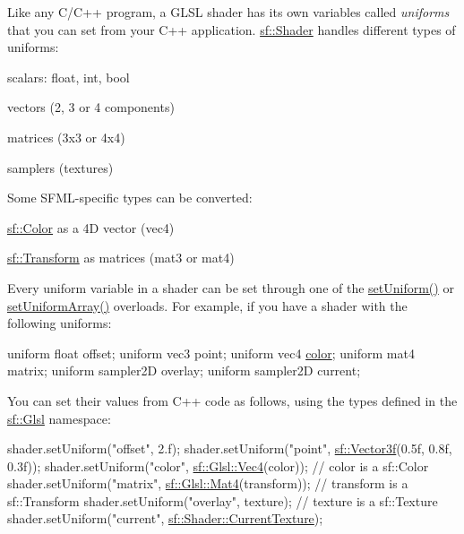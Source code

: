 Like any C/\-C++ program, a G\-L\-S\-L shader has its own variables called {\itshape uniforms} that you can set from your C++ application. \hyperlink{classsf_1_1_shader}{sf\-::\-Shader} handles different types of uniforms\-: \begin{DoxyItemize}
\item scalars\-: {\ttfamily float}, {\ttfamily int}, {\ttfamily bool} \item vectors (2, 3 or 4 components) \item matrices (3x3 or 4x4) \item samplers (textures)\end{DoxyItemize}
Some S\-F\-M\-L-\/specific types can be converted\-: \begin{DoxyItemize}
\item \hyperlink{classsf_1_1_color}{sf\-::\-Color} as a 4\-D vector ({\ttfamily vec4}) \item \hyperlink{classsf_1_1_transform}{sf\-::\-Transform} as matrices ({\ttfamily mat3} or {\ttfamily mat4})\end{DoxyItemize}
Every uniform variable in a shader can be set through one of the \hyperlink{classsf_1_1_shader_abf78e3bea1e9b0bab850b6b0a0de29c7}{set\-Uniform()} or \hyperlink{classsf_1_1_shader_a731d3b9953c50fe7d3fb03340b97deff}{set\-Uniform\-Array()} overloads. For example, if you have a shader with the following uniforms\-: 
\begin{DoxyCode}
uniform \textcolor{keywordtype}{float} offset;
uniform vec3 point;
uniform vec4 \hyperlink{_entity_8cpp_a864889304a90873adb9c6e289a54bcf4}{color};
uniform mat4 matrix;
uniform sampler2D overlay;
uniform sampler2D current;
\end{DoxyCode}
 You can set their values from C++ code as follows, using the types defined in the \hyperlink{namespacesf_1_1_glsl}{sf\-::\-Glsl} namespace\-: 
\begin{DoxyCode}
shader.setUniform(\textcolor{stringliteral}{"offset"}, 2.f);
shader.setUniform(\textcolor{stringliteral}{"point"}, \hyperlink{classsf_1_1_vector3}{sf::Vector3f}(0.5f, 0.8f, 0.3f));
shader.setUniform(\textcolor{stringliteral}{"color"}, \hyperlink{structsf_1_1priv_1_1_vector4}{sf::Glsl::Vec4}(color));          \textcolor{comment}{// color is a sf::Color}
shader.setUniform(\textcolor{stringliteral}{"matrix"}, \hyperlink{structsf_1_1priv_1_1_matrix}{sf::Glsl::Mat4}(transform));     \textcolor{comment}{// transform is a sf::Transform}
shader.setUniform(\textcolor{stringliteral}{"overlay"}, texture);                      \textcolor{comment}{// texture is a sf::Texture}
shader.setUniform(\textcolor{stringliteral}{"current"}, \hyperlink{classsf_1_1_shader_ad679e434fc4f1a1af65f3815b2310fb5}{sf::Shader::CurrentTexture});
\end{DoxyCode}



